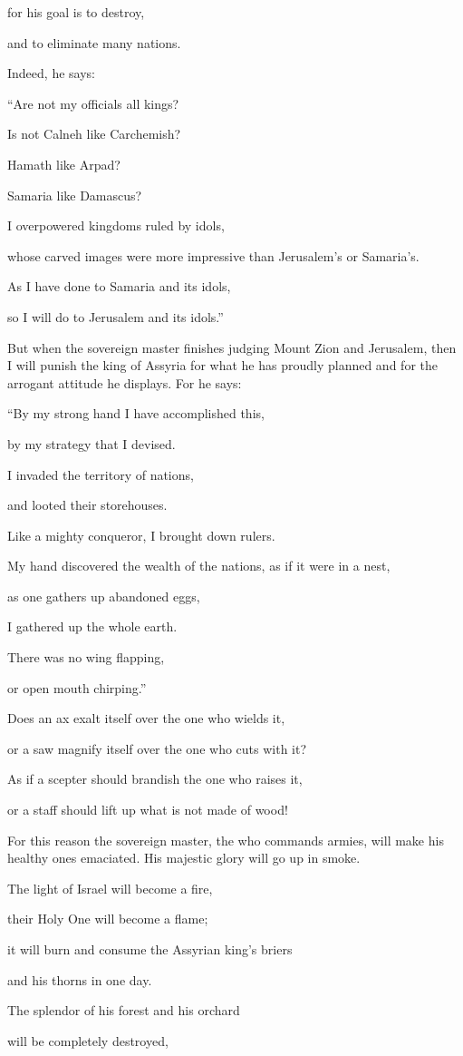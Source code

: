 {\par }{\Q for
his goal
is to destroy,
\par }{\Q and to eliminate
many nations.
\par }{\Q {}Indeed,
he says:
\par }{\Q “Are not
my officials
all
kings?
\par }{\Q {}Is not
Calneh
like Carchemish?
\par }{\Q Hamath
like Arpad?
\par }{\Q Samaria
like Damascus?
\par }{\Q {}I overpowered
kingdoms
ruled by idols,
\par }{\Q whose carved images
were more impressive than Jerusalem’s
or Samaria’s.
\par }{\Q {}As
I have
done
to Samaria
and its idols,
\par }{\Q so
I will do
to Jerusalem
and its idols.”
\par }{\PP {}But
when
the sovereign master
finishes
judging
Mount
Zion
and Jerusalem,
then I will punish
the king
of Assyria
for
what
he has proudly
planned
and for
the arrogant
attitude
he displays.
For
he says:
\par }{\Q “By my strong
hand
I have accomplished
this,
\par }{\Q by my strategy
that
I devised.
\par }{\Q I invaded
the territory
of nations,
\par }{\Q and looted
their storehouses.
\par }{\Q Like a mighty
conqueror, I brought down
rulers.
\par }{\Q {}My hand
discovered
the wealth
of the nations,
as if it were in a nest,
\par }{\Q as one gathers up
abandoned
eggs,
\par }{\Q I
gathered up
the whole
earth.
\par }{\Q There was
no
wing
flapping,
\par }{\Q or open
mouth
chirping.”
\par }{\Q {}Does an ax
exalt itself over
the one who wields it,
\par }{\Q or a saw
magnify
itself over
the one who cuts with it?

\par }{\Q As
if
a scepter
should brandish the
one who raises
it,
\par }{\Q or a staff
should lift up
what is not
made of wood!
\par }{\Q {}For
this reason the sovereign master,
the {}
who commands armies,
will make his healthy
ones emaciated.
His majestic glory
will go up in smoke.
\par }{\Q {}The light
of Israel
will become
a fire,
\par }{\Q their Holy One
will become a flame;
\par }{\Q it will burn
and consume
the Assyrian king’s briers
\par }{\Q and his thorns
in one
day.
\par }{\Q {}The splendor
of his forest
and his orchard
\par }{\Q will be
completely destroyed,

}
